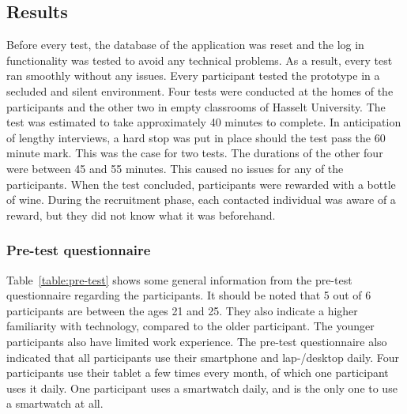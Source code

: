     \subsection{Results}

    Before every test, the database of the application was reset and the log in functionality was tested to avoid any technical problems. As a result, every test ran smoothly without any issues. Every participant tested the prototype in a secluded and silent environment. Four tests were conducted at the homes of the participants and the other two in empty classrooms of Hasselt University. The test was estimated to take approximately 40 minutes to complete. In anticipation of lengthy interviews, a hard stop was put in place should the test pass the 60 minute mark. This was the case for two tests. The durations of the other four were between 45 and 55 minutes. This caused no issues for any of the participants. When the test concluded, participants were rewarded with a bottle of wine. During the recruitment phase, each contacted individual was aware of a reward, but they did not know what it was beforehand. %

    \subsubsection{Pre-test questionnaire}

    Table~\ref{table:pre-test} shows some general information from the pre-test questionnaire regarding the participants. It should be noted that 5 out of 6 participants are between the ages 21 and 25. They also indicate a higher familiarity with technology, compared to the older participant. The younger participants also have limited work experience. The pre-test questionnaire also indicated that all participants use their smartphone and lap-/desktop daily. Four participants use their tablet a few times every month, of which one participant uses it daily. One participant uses a smartwatch daily, and is the only one to use a smartwatch at all.
    
